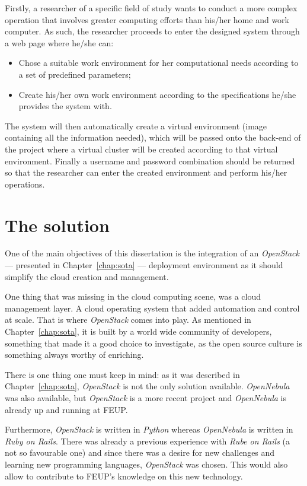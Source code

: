 Firstly, a researcher of a specific field of study wants to conduct a more complex operation that involves greater computing efforts than his/her home and work computer. As such, the researcher proceeds to enter the designed system through a web page where he/she can:

\begin{itemize}
	\item Chose a suitable work environment for her computational needs according to a set of predefined parameters;
	\item Create his/her own work environment according to the specifications he/she provides the system with.
\end{itemize}

The system will then automatically create a virtual environment (image containing all the information needed), which will be passed onto the back-end of the project where a virtual cluster will be created according to that virtual environment.
Finally a username and password combination should be returned so that the researcher can enter the created environment and perform his/her operations. 

\section{The solution}\label{sec:solution}

One of the main objectives of this dissertation is the integration of an \textit{OpenStack} --- presented in Chapter~\ref{chap:sota} --- deployment environment as it should simplify the cloud creation and management.

One thing that was missing in the cloud computing scene, was a cloud management layer. A cloud operating system that added automation and control at scale. That is where \textit{OpenStack} comes into play. As mentioned in Chapter~\ref{chap:sota}, it is built by a world wide community of developers, something that made it a good choice to investigate, as the open source culture is something always worthy of enriching.~\cite{https://github.com/dellcloudedge/crowbar/wiki/OpenStack-Essex-Deploy-Day}

There is one thing one must keep in mind: as it was described in Chapter~\ref{chap:sota}, \textit{OpenStack} is not the only solution available. \textit{OpenNebula} was also available, but \textit{OpenStack} is a more recent project and \textit{OpenNebula} is already up and running at FEUP. 

Furthermore, \textit{OpenStack} is written in \textit{Python} whereas \textit{OpenNebula} is written in \textit{Ruby on Rails}. There was already a previous experience with \textit{Rube on Rails} (a not so favourable one) and since there was a desire for new challenges and learning new programming languages, \textit{OpenStack} was chosen. This would also allow to contribute to FEUP's knowledge on this new technology.

